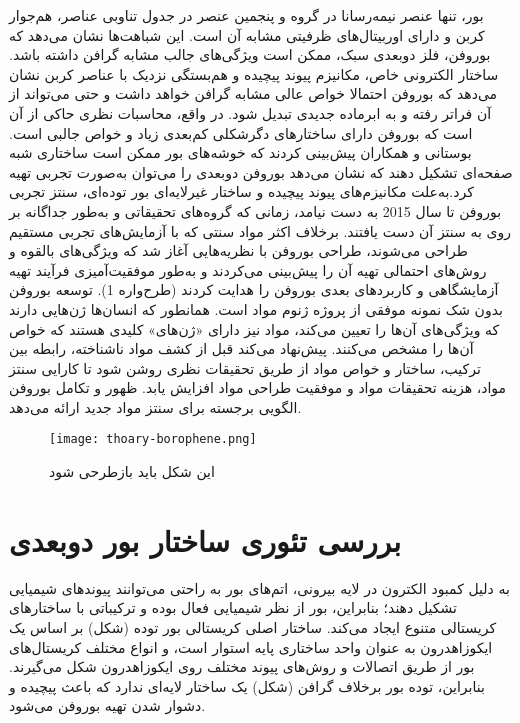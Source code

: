 بور، تنها عنصر نیمه‌رسانا در گروه  و پنجمین عنصر در جدول تناوبی عناصر، هم‌جوار کربن و دارای اوربیتال‌های ظرفیتی مشابه آن است. \cite{forteInitioPredictionBoron2010}این شباهت‌ها نشان می‌دهد که بوروفن، فلز دوبعدی سبک، ممکن است ویژگی‌های جالب مشابه گرافن داشته باشد. \cite{huangTwoDimensionalBoronPolymorphs2017, liuIntermixingPeriodicSelfassembly2018} ساختار الکترونی خاص، مکانیزم پیوند پیچیده و هم‌بستگی نزدیک با عناصر کربن نشان می‌دهد که بوروفن احتمالا خواص عالی مشابه گرافن خواهد داشت و حتی می‌تواند از آن فراتر رفته و به ابرماده جدیدی تبدیل شود. در واقع، محاسبات نظری حاکی از آن است که بوروفن دارای ساختارهای دگرشکلی کم‌بعدی زیاد و خواص جالبی است. \cite{liuBorophenegrapheneHeterostructures2019} بوستانی و همکاران \cite{boustaniSYSTEMATICLSDINVESTIGATION1994} پیش‌بینی کردند که خوشه‌های بور ممکن است ساختاری شبه صفحه‌ای تشکیل دهند که نشان می‌دهد بوروفن دوبعدی را می‌توان به‌صورت تجربی تهیه کرد.به‌علت مکانیزم‌های پیوند پیچیده و ساختار غیرلایه‌ای بور توده‌ای، سنتز تجربی بوروفن تا سال 2015 به دست نیامد، زمانی که گروه‌های تحقیقاتی  \cite{mannixSynthesisBorophenesAnisotropic2015} و  \cite{fengExperimentalRealizationTwodimensional2016} به‌طور جداگانه بر روی  به سنتز آن دست یافتند. برخلاف اکثر مواد سنتی که با آزمایش‌های تجربی مستقیم طراحی می‌شوند، طراحی بوروفن با نظریه‌هایی آغاز شد که ویژگی‌های بالقوه و روش‌های احتمالی تهیه آن را پیش‌بینی می‌کردند و به‌طور موفقیت‌آمیزی فرآیند تهیه آزمایشگاهی و کاربردهای بعدی بوروفن را هدایت کردند (طرح‌واره 1). توسعه بوروفن بدون شک نمونه موفقی از پروژه ژنوم مواد  است. همانطور که انسان‌ها ژن‌هایی دارند که ویژگی‌های آن‌ها را تعیین می‌کند، مواد نیز دارای «ژن‌های» کلیدی هستند که خواص آن‌ها را مشخص می‌کنند.  پیش‌نهاد می‌کند قبل از کشف مواد ناشناخته، رابطه بین ترکیب، ساختار و خواص مواد از طریق تحقیقات نظری روشن شود تا کارایی سنتز مواد، هزینه تحقیقات مواد و موفقیت طراحی مواد افزایش یابد. ظهور و تکامل بوروفن الگویی برجسته برای سنتز مواد جدید ارائه می‌دهد.

\begin{figure*}
    \centering
    \texttt{[image: thoary-borophene.png]}
    \caption{این شکل باید بازطرحی شود}
    \label{theoryborophene}
\end{figure*}
\section{بررسی تئوری ساختار بور دوبعدی}
به دلیل کمبود الکترون در لایه بیرونی، اتم‌های بور به راحتی می‌توانند پیوندهای شیمیایی تشکیل دهند؛ بنابراین، بور از نظر شیمیایی فعال بوده و ترکیباتی با ساختارهای کریستالی متنوع ایجاد می‌کند. ساختار اصلی کریستالی بور توده (شکل) بر اساس یک ایکوزاهدرون  به عنوان واحد ساختاری پایه استوار است، و انواع مختلف کریستال‌های بور از طریق اتصالات و روش‌های پیوند مختلف روی ایکوزاهدرون  شکل می‌گیرند. \cite{albertBoronElementaryChallenge2009} بنابراین، توده بور برخلاف گرافن (شکل) یک ساختار لایه‌ای ندارد که باعث پیچیده و دشوار شدن تهیه بوروفن می‌شود.

